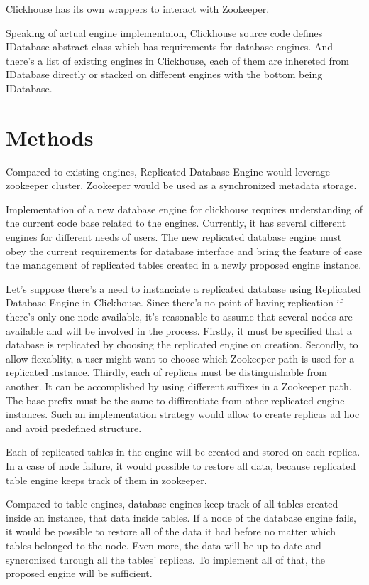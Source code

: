 \documentclass[conference]{IEEEtran}
\begin{document}
Clickhouse has its own wrappers to interact with Zookeeper.

Speaking of actual engine implementaion, Clickhouse source code\cite{clickhouse}
defines IDatabase abstract class which has
requirements for database engines. And there's a list of existing engines in Clickhouse, each
of them are inhereted from IDatabase directly or stacked on different engines with the
bottom being IDatabase.

\section{Methods}

Compared to existing engines, Replicated Database Engine
would leverage zookeeper cluster. Zookeeper would be used as a synchronized
metadata storage.

Implementation of a new database engine for clickhouse requires understanding of
the current code base related to the engines. Currently, it has several different
engines for different needs of users. The new replicated database engine must
obey the current requirements for database interface and bring the feature of ease
the management of replicated tables created in a newly proposed engine instance.

Let's suppose there's a need to instanciate a replicated database using
Replicated Database Engine in Clickhouse. Since there's no point of having replication
if there's only one node available, it's reasonable to assume that several nodes are
available and will be involved in the process. Firstly, it must be specified that
a database is replicated by choosing the replicated engine on creation. Secondly,
to allow flexablity, a user might want to choose which Zookeeper path is used for a
replicated instance. Thirdly, each of replicas must be distinguishable from another.
It can be accomplished by using different suffixes in a Zookeeper path. The base prefix
must be the same to diffirentiate from other replicated engine instances.
Such an implementation strategy would allow to create replicas ad hoc and avoid
predefined structure.

Each of replicated tables in the engine will be created and stored on each replica.
In a case of node failure, it would possible to restore all data, because replicated
table engine keeps track of them in zookeeper.

Compared to table engines, database engines keep track of all tables created inside an
instance, that data inside tables. If a node of the database engine fails, it would
be possible to restore all of the data it had before no matter which tables belonged
to the node. Even more, the data will be up to date and syncronized through all the tables'
replicas. To implement all of that, the proposed engine will be sufficient.
\end{document}
